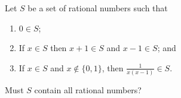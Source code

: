 Let $S$ be a set of rational numbers such that
\begin{enumerate}[label=(\alph*)]
	\item $0\in S$;
	\item If $x\in S$ then $x+1\in S$ and $x-1\in S$; and
	\item If $x\in S$ and $x\notin\{0,1\}$, then $\frac{1}{x(x-1)}\in S$.
\end{enumerate}
Must $S$ contain all rational numbers?